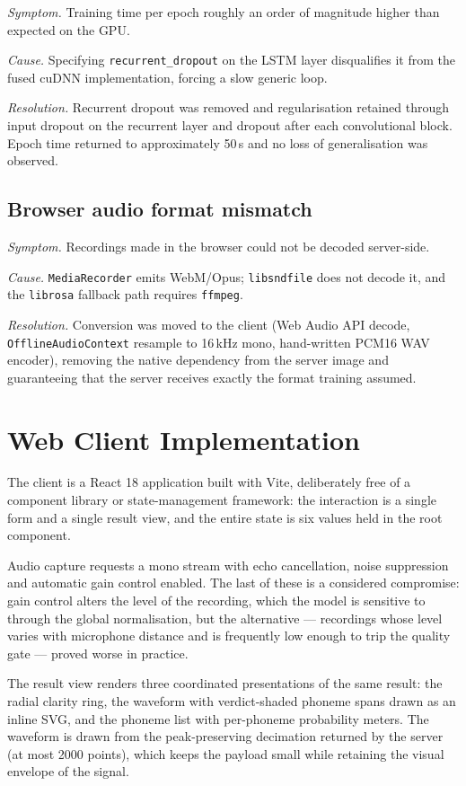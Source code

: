 \emph{Symptom.} Training time per epoch roughly an order of magnitude higher
than expected on the GPU.

\emph{Cause.} Specifying \texttt{recurrent\_dropout} on the LSTM layer
disqualifies it from the fused cuDNN implementation, forcing a slow generic
loop.

\emph{Resolution.} Recurrent dropout was removed and regularisation retained
through input dropout on the recurrent layer and dropout after each
convolutional block. Epoch time returned to approximately 50\,s and no loss of
generalisation was observed.

\subsection{Browser audio format mismatch}

\emph{Symptom.} Recordings made in the browser could not be decoded server-side.

\emph{Cause.} \texttt{MediaRecorder} emits WebM/Opus; \texttt{libsndfile} does
not decode it, and the \texttt{librosa} fallback path requires \texttt{ffmpeg}.

\emph{Resolution.} Conversion was moved to the client (Web Audio API decode,
\texttt{OfflineAudioContext} resample to 16\,kHz mono, hand-written PCM16 WAV
encoder), removing the native dependency from the server image and guaranteeing
that the server receives exactly the format training assumed.

\section{Web Client Implementation}
\label{sec:impl-frontend}

The client is a React 18 application built with Vite, deliberately free of a
component library or state-management framework: the interaction is a single
form and a single result view, and the entire state is six values held in the
root component.

Audio capture requests a mono stream with echo cancellation, noise suppression
and automatic gain control enabled. The last of these is a considered
compromise: gain control alters the level of the recording, which the model is
sensitive to through the global normalisation, but the alternative --- recordings
whose level varies with microphone distance and is frequently low enough to trip
the quality gate --- proved worse in practice.

The result view renders three coordinated presentations of the same result: the
radial clarity ring, the waveform with verdict-shaded phoneme spans drawn as an
inline SVG, and the phoneme list with per-phoneme probability meters. The
waveform is drawn from the peak-preserving decimation returned by the server
(at most 2000 points), which keeps the payload small while retaining the visual
envelope of the signal.

